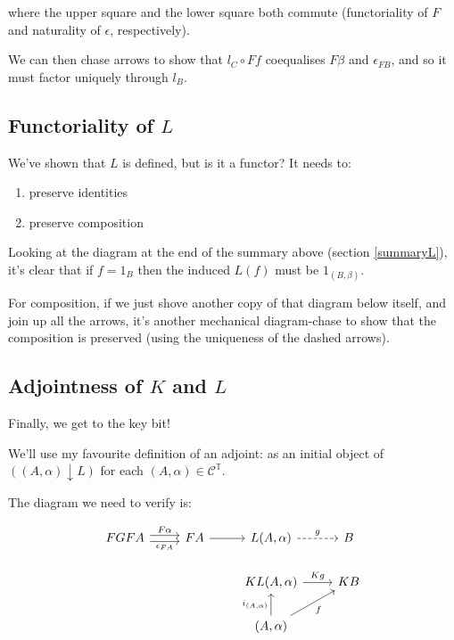 \documentclass[11pt]{amsart}
\begin{document}
where the upper square and the lower square both commute (functoriality of $F$ and naturality of $\epsilon$, respectively).

We can then chase arrows to show that $l_C \circ Ff$ coequalises $F\beta$ and $\epsilon_{FB}$, and so it must factor uniquely through $l_B$.

\subsection{Functoriality of \texorpdfstring{$L$}{L}}

We've shown that $L$ is defined, but is it a functor?
It needs to:

\begin{enumerate}
\item preserve identities
\item preserve composition
\end{enumerate}

Looking at the diagram at the end of the summary above (section \ref{summaryL}), it's clear that if $f = 1_B$ then the induced $L(f)$ must be $1_{(B, \beta)}$.

For composition, if we just shove another copy of that diagram below itself, and join up all the arrows, it's another mechanical diagram-chase to show that the composition is preserved (using the uniqueness of the dashed arrows).

\subsection{Adjointness of \texorpdfstring{$K$}{K} and \texorpdfstring{$L$}{L}}

Finally, we get to the key bit!

We'll use my favourite definition of an adjoint: as an initial object of $((A, \alpha) \downarrow L)$ for each $(A, \alpha) \in \mathcal{C}^{\mathbb{T}}$.

The diagram we need to verify is:

\[
\begin{tikzcd}
FGFA
    \arrow[r, shift left, "F \alpha"]
    \arrow[r, shift right, "\epsilon_{F A}"']
& F A
    \arrow[r]
& L(A, \alpha)
    \arrow[r, dashrightarrow, "g"]
& B
\\
& & KL(A, \alpha)
    \arrow[r, "K g"]
& K B
\\
& & (A, \alpha)
    \arrow[u, "i_{(A, \alpha)}"]
    \arrow[ur, "f"']
&
\end{tikzcd}
\]
\end{document}

